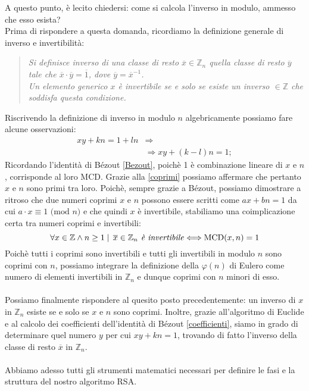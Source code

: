 \documentclass[a4paper,12pt]{article}
\begin{document}
A questo punto, è lecito chiedersi: come si calcola l'inverso in modulo, ammesso che esso esista?\\
Prima di rispondere a questa domanda, ricordiamo la definizione generale di inverso e invertibilità:
\begin{quote}
    \emph{Si definisce inverso di una classe di resto $\overline{x} \in \mathbb{Z}_n$ quella classe di resto $\overline{y}$ tale che $\overline{x} \cdot \overline{y} = \overline{1}$, dove $\overline{y}=\overline{x}^{-1}$.\\
    Un elemento generico $x$ è invertibile se e solo se esiste un inverso $\in \mathbb{Z}$ che soddisfa questa condizione.}
\end{quote}
Riscrivendo la definizione di inverso in modulo $n$ algebricamente possiamo fare alcune osservazioni:
\begin{equation}
\begin{split}
xy+kn=1+ln & \Longrightarrow\\
& \Longrightarrow xy + (k-l)n = 1;
\end{split}
\end{equation}
Ricordando l'identità di B\'ezout \eqref{Bezout}, poichè 1 è combinazione lineare di $x$ e $n$, corrisponde al loro MCD. Grazie alla \eqref{coprimi} possiamo affermare che pertanto $x$ e $n$ sono primi tra loro. Poichè, sempre grazie a B\'ezout, possiamo dimostrare a ritroso che due numeri coprimi $x$ e $n$ possono essere scritti come $ax+bn=1$ da cui $a \cdot x \equiv 1 \text{ (mod $n$)}$ e che quindi $x$ è invertibile, stabiliamo una coimplicazione certa tra numeri coprimi e invertibili:
\begin{equation}\label{CoprimiInvertibili}
\forall x \in \mathbb{Z} \land n \geq 1 \mid \, \overline{x} \in \mathbb{Z}_n \text{\emph{ è invertibile}} \Longleftrightarrow \text{MCD}(x,n)=1
\end{equation}
Poichè tutti i coprimi sono invertibili e tutti gli invertibili in modulo $n$ sono coprimi con $n$, possiamo integrare la definizione della $\varphi(n)$ di Eulero come numero di elementi invertibili in $\mathbb{Z}_n$ e dunque coprimi con $n$ minori di esso.\\\\
Possiamo finalmente rispondere al quesito posto precedentemente: un inverso di $x$ in $\mathbb{Z}_n$ esiste se e solo se $x$ e $n$ sono coprimi. Inoltre, grazie all'algoritmo di Euclide e al calcolo dei coefficienti dell'identità di B\'ezout \eqref{coefficienti}, siamo in grado di determinare quel numero $y$ per cui $xy+kn=1$, trovando di fatto l'inverso della classe di resto $\overline{x}$ in $\mathbb{Z}_n$.\\\\
Abbiamo adesso tutti gli strumenti matematici necessari per definire le fasi e la struttura del nostro algoritmo RSA.
\end{document}
